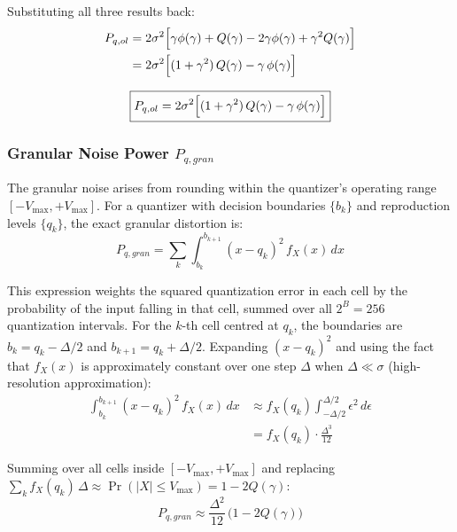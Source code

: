 \documentclass{article}
\begin{document}
Substituting all three results back:
\begin{align}
    P_{q,ol} &= 2\sigma^2\Bigl[
                 \gamma\phi(\gamma) + Q(\gamma)
                 - 2\gamma\phi(\gamma)
                 + \gamma^2 Q(\gamma)
                \Bigr] \nonumber\\
             &= 2\sigma^2\Bigl[
                 (1+\gamma^2)\,Q(\gamma) - \gamma\,\phi(\gamma)
                \Bigr]
\end{align}

\begin{equation}
\boxed{
    P_{q,ol} = 2\sigma^2\Bigl[(1+\gamma^2)\,Q(\gamma) 
               - \gamma\,\phi(\gamma)\Bigr]
}
\end{equation}

\subsubsection*{Granular Noise Power $P_{q,gran}$}

The granular noise arises from rounding within the quantizer's operating 
range $[-V_{\max}, +V_{\max}]$. For a quantizer with decision boundaries 
$\{b_k\}$ and reproduction levels $\{q_k\}$, the exact granular distortion is:
\begin{equation}
    P_{q,gran} = \sum_{k} \int_{b_k}^{b_{k+1}} 
                 (x - q_k)^2\,f_X(x)\,dx
\end{equation}

This expression weights the squared quantization error in each cell by 
the probability of the input falling in that cell, summed over all 
$2^B = 256$ quantization intervals. For the $k$-th cell centred at 
$q_k$, the boundaries are $b_k = q_k - \Delta/2$ and 
$b_{k+1} = q_k + \Delta/2$. Expanding $(x - q_k)^2$ and using the 
fact that $f_X(x)$ is approximately constant over one step $\Delta$ 
when $\Delta \ll \sigma$ (high-resolution approximation):
\begin{align}
    \int_{b_k}^{b_{k+1}} (x-q_k)^2\,f_X(x)\,dx 
    &\approx f_X(q_k)\int_{-\Delta/2}^{\Delta/2} \epsilon^2\,d\epsilon 
     \nonumber\\
    &= f_X(q_k)\cdot\frac{\Delta^3}{12}
\end{align}

Summing over all cells inside $[-V_{\max}, +V_{\max}]$ and replacing 
$\sum_k f_X(q_k)\,\Delta \approx \Pr(|X| \leq V_{\max}) 
= 1 - 2Q(\gamma)$:
\begin{equation}
    P_{q,gran} \approx \frac{\Delta^2}{12}\,\bigl(1 - 2Q(\gamma)\bigr)
\end{equation}
\end{document}
